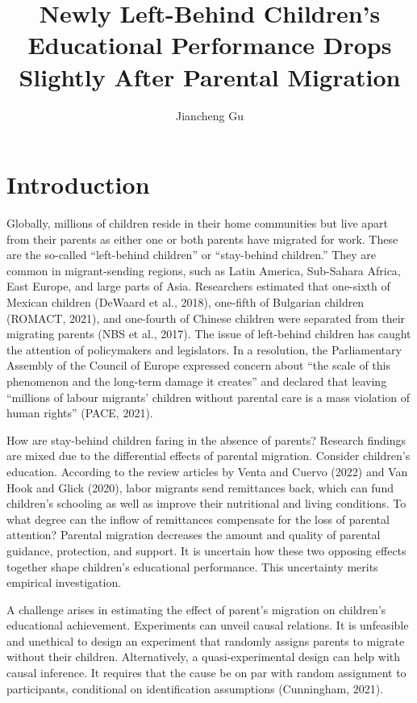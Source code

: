 \documentclass[
  man,floatsintext]{apa7}
\title{Newly Left-Behind Children's Educational Performance Drops Slightly After Parental Migration}
\author{Jiancheng Gu\textsuperscript{}}
\date{}
\affiliation{\vspace{0.5cm}\textsuperscript{1} Faculty of Social Sciences, Vrije Universiteit Amsterdam}
\begin{document}
\maketitle

\hypertarget{introduction}{%
\section{Introduction}\label{introduction}}

Globally, millions of children reside in their home communities but live apart from their parents as either one or both parents have migrated for work. These are the so-called ``left-behind children'' or ``stay-behind children.'' They are common in migrant-sending regions, such as Latin America, Sub-Sahara Africa, East Europe, and large parts of Asia. Researchers estimated that one-sixth of Mexican children (DeWaard et al., 2018), one-fifth of Bulgarian children (ROMACT, 2021), and one-fourth of Chinese children were separated from their migrating parents (NBS et al., 2017). The issue of left-behind children has caught the attention of policymakers and legislators. In a resolution, the Parliamentary Assembly of the Council of Europe expressed concern about ``the scale of this phenomenon and the long-term damage it creates'' and declared that leaving ``millions of labour migrants' children without parental care is a mass violation of human rights'' (PACE, 2021).

How are stay-behind children faring in the absence of parents? Research findings are mixed due to the differential effects of parental migration. Consider children's education. According to the review articles by Venta and Cuervo (2022) and Van Hook and Glick (2020), labor migrants send remittances back, which can fund children's schooling as well as improve their nutritional and living conditions. To what degree can the inflow of remittances compensate for the loss of parental attention? Parental migration decreases the amount and quality of parental guidance, protection, and support. It is uncertain how these two opposing effects together shape children's educational performance. This uncertainty merits empirical investigation.

A challenge arises in estimating the effect of parent's migration on children's educational achievement. Experiments can unveil causal relations. It is unfeasible and unethical to design an experiment that randomly assigns parents to migrate without their children. Alternatively, a quasi-experimental design can help with causal inference. It requires that the cause be on par with random assignment to participants, conditional on identification assumptions (Cunningham, 2021).
\end{document}
